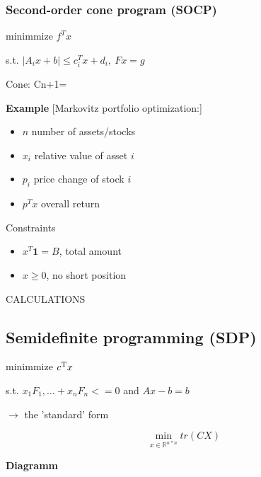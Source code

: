 
\subsubsection{Second-order cone program (SOCP)}

minimmize $f^Tx$

s.t. $|A_ix+b|\le c_i^Tx+d_i,\ Fx=g$

Cone: Cn+1=

\textbf{Example} [Markovitz portfolio optimization:]

\begin{itemize}
	\item $n$ number of assets/stocks
	\item $x_i$ relative value of asset $i$
	\item $p_i$ price change of stock $i$
	\item $p^Tx$ overall return
\end{itemize}

Constraints

\begin{itemize}
	\item $x^T\textbf{1} = B$, total amount
	\item $x\ge0$, no short position
\end{itemize}

CALCULATIONS

\subsection{Semidefinite programming (SDP)}

minimmize $c^{\textnormal{\scriptsize T}}x$

s.t. $x_1F_1,\dots+x_nF_n <= 0$ and $Ax-b=b$

$\rightarrow$ the 'standard' form

$$\min _{x \in \mathbb{R}^{n*n}} tr(CX)$$


\textbf{Diagramm}
